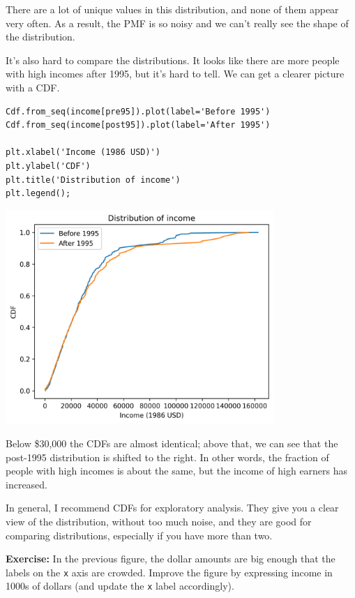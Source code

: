 There are a lot of unique values in this distribution, and none of them
appear very often. As a result, the PMF is so noisy and we can't really
see the shape of the distribution.

It's also hard to compare the distributions. It looks like there are
more people with high incomes after 1995, but it's hard to tell. We can
get a clearer picture with a CDF.

\begin{lstlisting}[]
Cdf.from_seq(income[pre95]).plot(label='Before 1995')
Cdf.from_seq(income[post95]).plot(label='After 1995')

plt.xlabel('Income (1986 USD)')
plt.ylabel('CDF')
plt.title('Distribution of income')
plt.legend();
\end{lstlisting}

\begin{center}
\includegraphics[width=4in]{chapters/08_distributions_files/08_distributions_101_0.png}
\end{center}

Below \$30,000 the CDFs are almost identical; above that, we can see
that the post-1995 distribution is shifted to the right. In other words,
the fraction of people with high incomes is about the same, but the
income of high earners has increased.

In general, I recommend CDFs for exploratory analysis. They give you a
clear view of the distribution, without too much noise, and they are
good for comparing distributions, especially if you have more than two.

\textbf{Exercise:} In the previous figure, the dollar amounts are big
enough that the labels on the \passthrough{\lstinline!x!} axis are
crowded. Improve the figure by expressing income in 1000s of dollars
(and update the \passthrough{\lstinline!x!} label accordingly).

